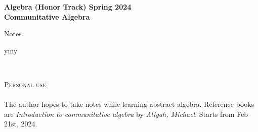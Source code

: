 \documentclass[11pt,fleqn]{book} %
\begin{document}
\begin{CJK}{UTF8}{gkai} %

\begingroup
\thispagestyle{empty}
\centering
\vspace*{5cm}
\par\normalfont\fontsize{35}{35}\sffamily\selectfont
\textbf{Algebra (Honor Track) Spring 2024}\\
\vspace*{0.4cm}
{\Huge \textbf{Communitative Algebra}}\par %
\vspace*{0.4cm}
{\Huge Notes}\par %
{\Large ymy}\par
\endgroup


\newpage
~\vfill
\thispagestyle{empty}


\noindent \textsc{Personal use}\\

\\ %

\noindent The author hopes to take notes while learning abstract algebra. Reference books are \textit{Introduction to communitative algebra} by \textit{Atiyah, Michael}. Starts from Feb 21st, 2024. 



\pagestyle{empty} %

\tableofcontents %



\end{CJK}
\end{document}
